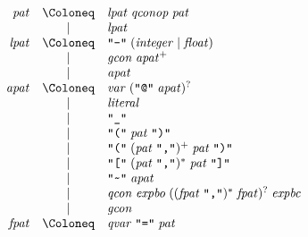 \begin{align*}
  \begin{array}{rcl}
    \mathit{pat}
    & \Coloneq & \mathit{lpat}\; \mathit{qconop}\; \mathit{pat} \\
    & \mid & \mathit{lpat} \\
    \mathit{lpat}
    & \Coloneq & \text{\texttt{\textquotedbl -\textquotedbl}}\; (\mathit{integer} \mid \mathit{float}) \\
    & \mid & \mathit{gcon}\; \mathit{apat}^+ \\
    & \mid & \mathit{apat} \\
    \mathit{apat}
    & \Coloneq & \mathit{var}\; (\text{\texttt{\textquotedbl @\textquotedbl}}\; \mathit{apat})^? \\
    & \mid & \mathit{literal} \\
    & \mid & \text{\texttt{\textquotedbl\textunderscore\textquotedbl}} \\
    & \mid & \text{\texttt{\textquotedbl(\textquotedbl}}\; \mathit{pat}\; \text{\texttt{\textquotedbl)\textquotedbl}} \\
    & \mid & \text{\texttt{\textquotedbl(\textquotedbl}}\; (\mathit{pat}\; \text{\texttt{\textquotedbl,\textquotedbl}})^+\; \mathit{pat}\; \text{\texttt{\textquotedbl)\textquotedbl}} \\
    & \mid & \text{\texttt{\textquotedbl[\textquotedbl}}\; (\mathit{pat}\; \text{\texttt{\textquotedbl,\textquotedbl}})^*\; \mathit{pat}\; \text{\texttt{\textquotedbl]\textquotedbl}} \\
    & \mid & \text{\texttt{\textquotedbl\textasciitilde\textquotedbl}}\; \mathit{apat} \\
    & \mid & \mathit{qcon}\; \mathit{expbo}\; ((\mathit{fpat}\; \text{\texttt{\textquotedbl,\textquotedbl}})^*\; \mathit{fpat})^?\; \mathit{expbc} \\
    & \mid & \mathit{gcon} \\
    \mathit{fpat}
    & \Coloneq & \mathit{qvar}\; \text{\texttt{\textquotedbl =\textquotedbl}}\; \mathit{pat}
  \end{array}
\end{align*}

